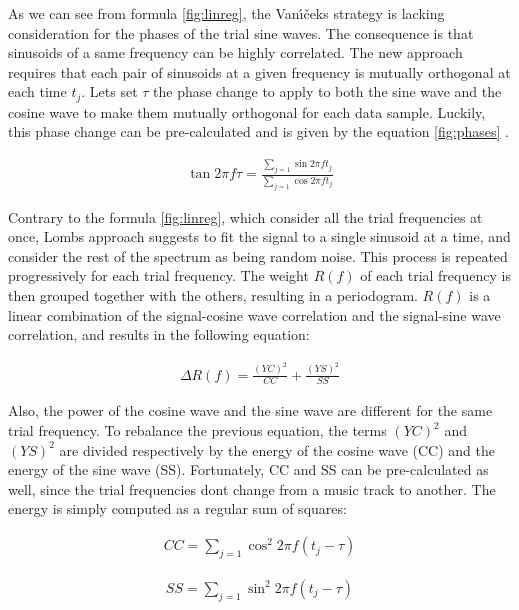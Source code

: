 \documentclass[letterpaper]{article}
\begin{document}
As we can see from formula \ref{fig:linreg}, the Van\'{\i}\v{c}ek\textquotesingle s strategy is lacking consideration for the phases of the trial sine waves.
The consequence is that sinusoids of a same frequency can be highly correlated. The new approach requires that each pair of sinusoids at a given frequency
is mutually orthogonal at each time $t_{j}$. Let\textquotesingle s set $\tau$ the phase change to apply to both the sine wave and the cosine wave to make
them mutually orthogonal for each data sample. Luckily, this phase change can be pre-calculated and is given by the equation \ref{fig:phases} \citep{LS}.

\begin{align}
\tan 2\pi f \tau = \frac{\sum\limits_{j=1} \sin 2\pi f t_{j}}{\sum\limits_{j=1} \cos 2\pi f t_{j}}
\label{fig:phases}
\end{align}

Contrary to the formula \ref{fig:linreg}, which consider all the trial frequencies at once, Lomb\textquotesingle s approach suggests to fit the signal to a single sinusoid at a time, and consider the rest of the spectrum as being random noise. This process is repeated progressively for each trial frequency. The weight $R(f)$ of each trial frequency is then grouped together with the others, resulting in a periodogram. $R(f)$ is a linear combination of
the signal-cosine wave correlation and the signal-sine wave correlation, and results in the following equation:

\begin{align}
\Delta R(f) = \frac{(YC)^{2}}{CC} 
+ \frac{(YS)^{2}}{SS}
\label{fig:ccss}
\end{align}

Also, the power of the cosine wave and the sine wave are different for the same trial frequency. To rebalance the previous equation, the terms $(YC)^2$ and $(YS)^2$ are divided respectively by the energy of the cosine wave (CC) and the energy of the sine wave (SS).
Fortunately, CC and SS can be pre-calculated as well, since the trial frequencies don\textquotesingle t change from a music track to another. The energy is simply computed as a regular sum of squares:

\begin{align}
CC = \sum\limits_{j=1} \cos^{2} 2\pi f (t_{j} - \tau)
\label{fig:cc}
\end{align}

\begin{align}
SS = \sum\limits_{j=1} \sin^{2} 2\pi f (t_{j} - \tau)
\label{fig:ss}
\end{align}
\end{document}
